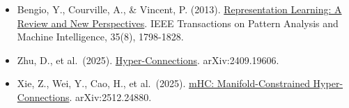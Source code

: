 \vspace{0.25em}
\begin{itemize}
\tightlist
\item
  Bengio, Y., Courville, A., \& Vincent, P. (2013). \href{https://arxiv.org/abs/1206.5538}{Representation Learning: A Review and New Perspectives}. IEEE Transactions on Pattern Analysis and Machine Intelligence, 35(8), 1798-1828.
\item
  Zhu, D., et al.~(2025). \href{https://arxiv.org/abs/2409.19606}{Hyper-Connections}. arXiv:2409.19606.
\item
  Xie, Z., Wei, Y., Cao, H., et al.~(2025). \href{https://arxiv.org/abs/2512.24880}{mHC: Manifold-Constrained Hyper-Connections}. arXiv:2512.24880.
\end{itemize}

\clearpage
